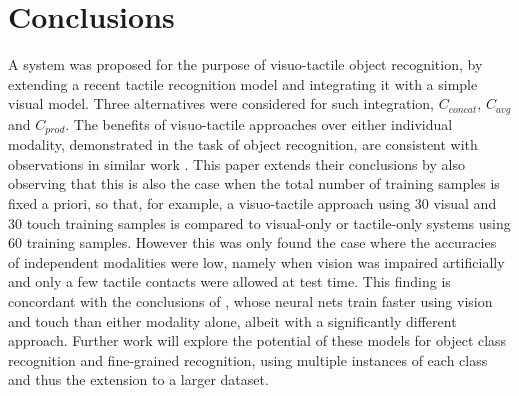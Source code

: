 \documentclass[9pt,technote]{IEEEtran}  %
\begin{document}
\section{Conclusions}
A system was proposed for the purpose of visuo-tactile object recognition, by extending a recent tactile recognition model \cite{Corradi2015} and integrating it with a simple visual model. Three alternatives were considered for such integration, $C_{concat}$, $C_{avg}$ and $C_{prod}$. The benefits of visuo-tactile approaches over either individual modality, demonstrated in the task of object recognition, are consistent with observations in similar work \cite{Yang2015}. This paper extends their conclusions by also observing that this is also the case when the total number of training samples is fixed a priori, so that, for example, a visuo-tactile approach using 30 visual and 30 touch training samples is compared to visual-only or tactile-only systems using 60 training samples. However this was only found the case where the accuracies of independent modalities were low, namely when vision was impaired artificially and only a few tactile contacts were allowed at test time. This finding is concordant with the conclusions of \cite{Kim2004}, whose neural nets train faster using vision and touch than either modality alone, albeit with a significantly different approach. Further work will explore the potential of these models for object class recognition and fine-grained recognition, using multiple instances of each class and thus the extension to a larger dataset.
	



	
\end{document}
